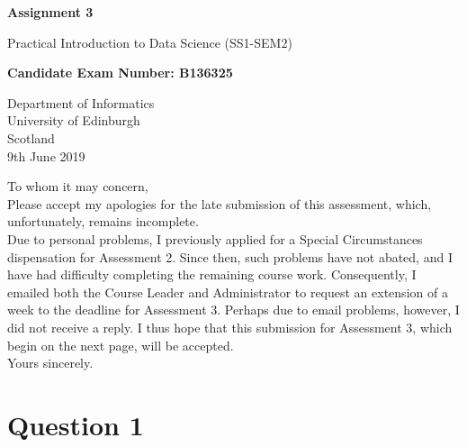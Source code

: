 \documentclass[12pt, oneside, openany]{book}
\begin{document}
    \frontmatter

\begin{titlepage}
   \begin{center}
       \vspace*{1cm}
 
       \textbf{Assignment 3}
 
       \vspace{0.5cm}
        Practical Introduction to Data Science (SS1-SEM2)
 
       \vspace{1.5cm}
 
       \textbf{Candidate Exam Number: B136325}
 
       \vfill
 
       \vspace{0.8cm}
 
       Department of Informatics\\
       University of Edinburgh\\
       Scotland\\
       9th June 2019
 
   \end{center}
\end{titlepage}
    \pagestyle{plain}

    \tableofcontents

    \mainmatter

    \pagestyle{plain}

\setcounter{equation}{0}
\vspace*{\fill}
To whom it may concern,
\\[12pt]
Please accept my apologies for the late submission of this assessment, which, unfortunately, remains incomplete.\\[12pt]
Due to personal problems, I previously applied for a Special Circumstances dispensation for Assessment 2. Since then, such problems have not abated, and I have had difficulty completing the remaining course work. Consequently, I emailed both the Course Leader and Administrator to request an extension of a week to the deadline for Assessment 3. Perhaps due to email problems, however, I did not receive a reply. I thus hope that this submission for Assessment 3, which begin on the next page, will be accepted. \\[12pt]
\vspace{10px}
Yours sincerely.
 
\vspace*{\fill}
\newpage
\chapter*{Question 1}
\end{document}
